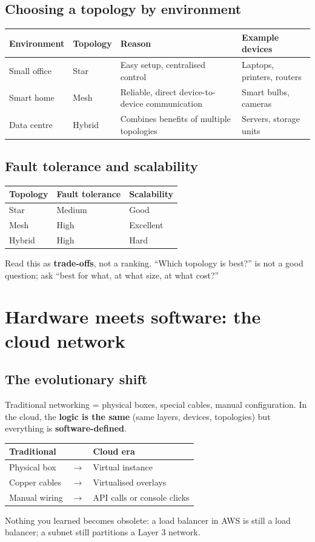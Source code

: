 \subsection{Choosing a topology by environment}
\begin{center}
\begin{tabularx}{\textwidth}{l l X l}
\toprule
Environment & Topology & Reason & Example devices \\
\midrule
Small office & Star & Easy setup, centralised control & Laptops, printers, routers \\
Smart home & Mesh & Reliable, direct device-to-device communication & Smart bulbs, cameras \\
Data centre & Hybrid & Combines benefits of multiple topologies & Servers, storage units \\
\bottomrule
\end{tabularx}
\end{center}

\subsection{Fault tolerance and scalability}
\begin{center}
\begin{tabular}{lll}
\toprule
Topology & Fault tolerance & Scalability \\
\midrule
Star & Medium & Good \\
Mesh & High & Excellent \\
Hybrid & High & Hard \\
\bottomrule
\end{tabular}
\end{center}
Read this as \textbf{trade-offs}, not a ranking. ``Which topology is best?'' is not a good question; ask ``best for what, at what size, at what cost?''

\section{Hardware meets software: the cloud network}

\subsection{The evolutionary shift}
Traditional networking = physical boxes, special cables, manual configuration. In the cloud, the \textbf{logic is the same} (same layers, devices, topologies) but everything is \textbf{software-defined}.
\begin{center}
\begin{tabular}{lcl}
\toprule
Traditional & & Cloud era \\
\midrule
Physical box & $\to$ & Virtual instance \\
Copper cables & $\to$ & Virtualised overlays \\
Manual wiring & $\to$ & API calls or console clicks \\
\bottomrule
\end{tabular}
\end{center}
Nothing you learned becomes obsolete: a load balancer in AWS is still a load balancer; a subnet still partitions a Layer 3 network.

